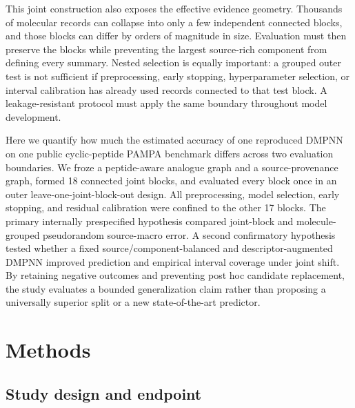 \documentclass[referee,lineno,pdflatex,Numbered,sn-basic]{sn-jnl}
\begin{document}
This joint construction also exposes the effective evidence geometry. Thousands of molecular records can collapse into only a few independent connected blocks, and those blocks can differ by orders of magnitude in size. Evaluation must then preserve the blocks while preventing the largest source-rich component from defining every summary. Nested selection is equally important: a grouped outer test is not sufficient if preprocessing, early stopping, hyperparameter selection, or interval calibration has already used records connected to that test block. A leakage-resistant protocol must apply the same boundary throughout model development.

Here we quantify how much the estimated accuracy of one reproduced DMPNN on one public cyclic-peptide PAMPA benchmark differs across two evaluation boundaries. We froze a peptide-aware analogue graph and a source-provenance graph, formed 18 connected joint blocks, and evaluated every block once in an outer leave-one-joint-block-out design. All preprocessing, model selection, early stopping, and residual calibration were confined to the other 17 blocks. The primary internally prespecified hypothesis compared joint-block and molecule-grouped pseudorandom source-macro error. A second confirmatory hypothesis tested whether a fixed source/component-balanced and descriptor-augmented DMPNN improved prediction and empirical interval coverage under joint shift. By retaining negative outcomes and preventing post hoc candidate replacement, the study evaluates a bounded generalization claim rather than proposing a universally superior split or a new state-of-the-art predictor.

\section{Methods}

\subsection{Study design and endpoint}
\end{document}
